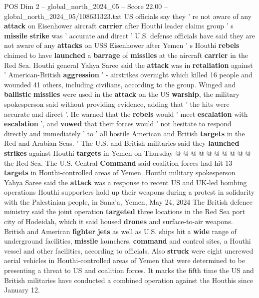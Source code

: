 \begin{textsample}{POS Dim 2 – global\_north\_2024\_05 – Score 22.00 – global\_north\_2024\_05/108631323.txt}  \label{ex:f2_pos_383}
US officials say they ' re not aware of any \textbf{attack} on Eisenhower aircraft \textbf{carrier} after Houthi leader claims group ' s \textbf{missile} \textbf{strike} was ' accurate and direct ' U.S. defense officials have said they are not aware of any \textbf{attacks} on USS Eisenhower after Yemen ' s Houthi \textbf{rebels} claimed to have \textbf{launched} a \textbf{barrage} of \textbf{missiles} at the aircraft \textbf{carrier} in the Red Sea.
Houthi general Yahya Saree said the \textbf{attack} was in \textbf{retaliation} against ' American-British \textbf{aggression} ' - airstrikes overnight which killed 16 people and wounded 41 others, including civilians, according to the group.
Winged and \textbf{ballistic} \textbf{missiles} were used in the \textbf{attack} on the US \textbf{warship}, the military spokesperson said without providing evidence, adding that ' the hits were accurate and direct '.
He warned that the \textbf{rebels} would ' meet \textbf{escalation} with \textbf{escalation} ', and \textbf{vowed} that their forces would ' not hesitate to respond directly and immediately ' to ' all hostile American and British \textbf{targets} in the Red and Arabian Seas. ' The U.S. and British militaries said they \textbf{launched} \textbf{strikes} against Houthi \textbf{targets} in Yemen on Thursday @ @ @ @ @ @ @ @ @ @ the Red Sea.
The U.S.
Central \textbf{Command} said coalition forces had hit 13 \textbf{targets} in Houthi-controlled areas of Yemen.
Houthi military spokesperson Yahya Saree said the \textbf{attack} was a response to recent US and UK-led bombing operations Houthi supporters hold up their weapons during a protest in solidarity with the Palestinian people, in Sana'a, Yemen, May 24, 2024 The British defence ministry said the joint operation \textbf{targeted} three locations in the Red Sea port city of Hodeidah, which it said housed \textbf{drones} and surface-to-air weapons.
British and American \textbf{fighter} \textbf{jets} as well as U.S. ships hit a \textbf{wide} range of underground facilities, \textbf{missile} launchers, \textbf{command} and control sites, a Houthi vessel and other facilities, according to officials.
Also \textbf{struck} were eight uncrewed aerial vehicles in Houthi-controlled areas of Yemen that were determined to be presenting a threat to US and coalition forces.
It marks the fifth time the US and British militaries have conducted a combined operation against the Houthis since January 12.

\end{textsample}
